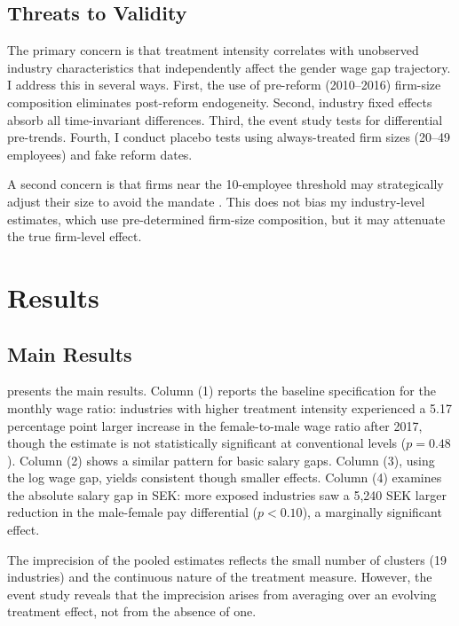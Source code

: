 \documentclass[12pt]{article}
\begin{document}
\subsection{Threats to Validity}

The primary concern is that treatment intensity correlates with unobserved industry characteristics that independently affect the gender wage gap trajectory. I address this in several ways. First, the use of pre-reform (2010--2016) firm-size composition eliminates post-reform endogeneity. Second, industry fixed effects absorb all time-invariant differences. Third, the event study tests for differential pre-trends. Fourth, I conduct placebo tests using always-treated firm sizes (20--49 employees) and fake reform dates.

A second concern is that firms near the 10-employee threshold may strategically adjust their size to avoid the mandate \citep{garicano2016firm}. This does not bias my industry-level estimates, which use pre-determined firm-size composition, but it may attenuate the true firm-level effect.

\section{Results}
\label{sec:results}

\subsection{Main Results}



 presents the main results. Column (1) reports the baseline specification for the monthly wage ratio: industries with higher treatment intensity experienced a 5.17 percentage point larger increase in the female-to-male wage ratio after 2017, though the estimate is not statistically significant at conventional levels ($p = 0.48$). Column (2) shows a similar pattern for basic salary gaps. Column (3), using the log wage gap, yields consistent though smaller effects. Column (4) examines the absolute salary gap in SEK: more exposed industries saw a 5,240 SEK larger reduction in the male-female pay differential ($p < 0.10$), a marginally significant effect.

The imprecision of the pooled estimates reflects the small number of clusters (19 industries) and the continuous nature of the treatment measure. However, the event study reveals that the imprecision arises from averaging over an evolving treatment effect, not from the absence of one.
\end{document}
